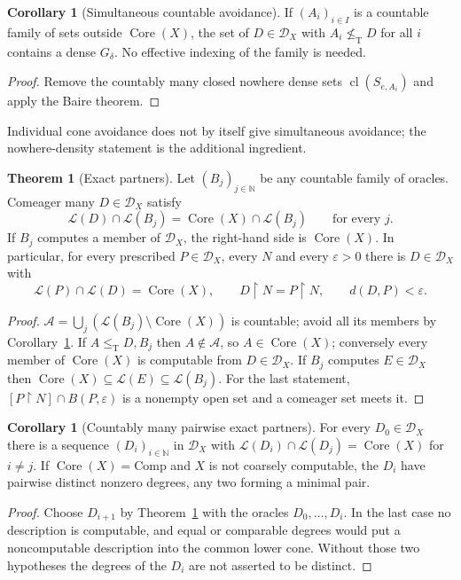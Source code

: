 \documentclass[11pt,letterpaper]{article}
\theoremstyle{definition}
\newtheorem{theorem}[definition]{Theorem}
\newtheorem{corollary}[definition]{Corollary}
\numberwithin{equation}{section}
\newcommand{\N}{\mathbb N}
\newcommand{\leT}{\le_{\mathrm T}}
\newcommand{\nleT}{\nleq_{\mathrm T}}
\newcommand{\DX}[1]{\mathcal D_{#1}}
\newcommand{\Low}{\mathcal L}
\newcommand{\Core}{\operatorname{Core}}
\newcommand{\Comp}{\mathrm{Comp}}
\newcommand{\rest}{\mathbin{\upharpoonright}}
\newcommand{\cl}{\operatorname{cl}}
\newcommand{\src}[1]{\leavevmode{\sffamily\footnotesize\color{Steel}[#1]}}
\begin{document}
\begin{corollary}[Simultaneous countable avoidance]\label{cor:avoid}\src{R1, R8, R9}
If $(A_i)_{i\in I}$ is a countable family of sets outside $\Core(X)$, the set of $D\in\DX X$ with $A_i\nleT D$ for all $i$ contains a dense $G_\delta$. No effective indexing of the family is needed.
\end{corollary}
\begin{proof}
Remove the countably many closed nowhere dense sets $\cl(S_{e,A_i})$ and apply the Baire theorem.
\end{proof}
Individual cone avoidance does not by itself give simultaneous avoidance; the nowhere-density statement is the additional ingredient.

\begin{theorem}[Exact partners]\label{thm:partners}\src{R1, R8 for one oracle; R9 for countably many}
Let $(B_j)_{j\in\N}$ be any countable family of oracles. Comeager many $D\in\DX X$ satisfy
\begin{equation}\label{eq:exact}
 \Low(D)\cap\Low(B_j)=\Core(X)\cap\Low(B_j)\qquad\text{for every }j .
\end{equation}
If $B_j$ computes a member of $\DX X$, the right-hand side is $\Core(X)$. In particular, for every prescribed $P\in\DX X$, every $N$ and every $\varepsilon>0$ there is $D\in\DX X$ with
\[
 \Low(P)\cap\Low(D)=\Core(X),\qquad D\rest N=P\rest N,\qquad d(D,P)<\varepsilon .
\]
\end{theorem}
\begin{proof}
$\mathcal A=\bigcup_j(\Low(B_j)\setminus\Core(X))$ is countable; avoid all its members by Corollary~\ref{cor:avoid}. If $A\leT D,B_j$ then $A\notin\mathcal A$, so $A\in\Core(X)$; conversely every member of $\Core(X)$ is computable from $D\in\DX X$. If $B_j$ computes $E\in\DX X$ then $\Core(X)\subseteq\Low(E)\subseteq\Low(B_j)$. For the last statement, $[P\rest N]\cap B(P,\varepsilon)$ is a nonempty open set and a comeager set meets it.
\end{proof}

\begin{corollary}[Countably many pairwise exact partners]\label{cor:many}\src{R1}
For every $D_0\in\DX X$ there is a sequence $(D_i)_{i\in\N}$ in $\DX X$ with $\Low(D_i)\cap\Low(D_j)=\Core(X)$ for $i\ne j$. If $\Core(X)=\Comp$ and $X$ is not coarsely computable, the $D_i$ have pairwise distinct nonzero degrees, any two forming a minimal pair.
\end{corollary}
\begin{proof}
Choose $D_{i+1}$ by Theorem~\ref{thm:partners} with the oracles $D_0,\dots,D_i$. In the last case no description is computable, and equal or comparable degrees would put a noncomputable description into the common lower cone. Without those two hypotheses the degrees of the $D_i$ are not asserted to be distinct.
\end{proof}
\end{document}
